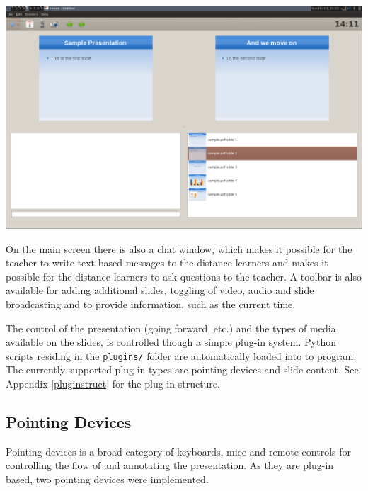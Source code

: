 \documentclass[a4paper,12pt]{article}
\begin{document}
\begin{center}
	\includegraphics[scale=0.3]{screen.png}
	\label{fig:mainwindow}
\end{center}

On the main screen there is also a chat window, which makes it possible for the teacher to write text based messages to the distance learners and makes it possible for the distance learners to ask questions to the teacher. 
A toolbar is also available for adding additional slides, toggling of video, audio and slide broadcasting and to provide information, such as the current time.

The control of the presentation (going forward, etc.) and the types of media available on the slides, is controlled though a simple plug-in system. Python scripts residing in the \texttt{plugins/} folder are automatically loaded into to program. The currently supported plug-in types are pointing devices and slide content. See Appendix \ref{pluginstruct} for the plug-in structure.

\subsection{Pointing Devices}
Pointing devices is a broad category of keyboards, mice and remote controls for controlling the flow of and annotating the presentation. As they are plug-in based, two pointing devices were implemented. 
\\
\end{document}
